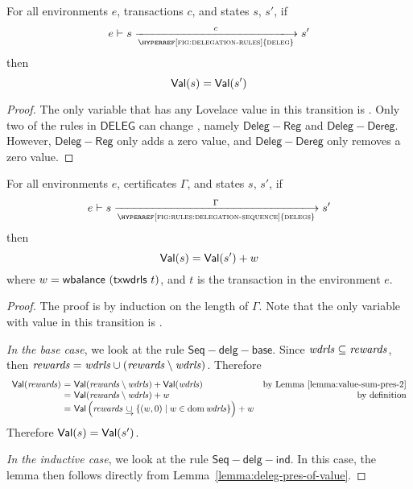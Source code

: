 \begin{lemma}
  \label{lemma:deleg-pres-of-value}
  For all environments $e$, transactions $c$, and states $s$, $s'$, if
  \begin{equation*}
    e\vdash s\trans{\hyperref[fig:delegation-rules]{deleg}}{c}s'
  \end{equation*}
  then
  \begin{equation*}
    \mathsf{Val}(s) = \mathsf{Val}(s')
  \end{equation*}
\end{lemma}

\begin{proof}
  The only variable that has any Lovelace value in this transition is .
  Only two of the rules in $\mathsf{DELEG}$ can change ,
  namely $\mathsf{Deleg{-}Reg}$ and $\mathsf{Deleg{-}Dereg}$.
  However, $\mathsf{Deleg{-}Reg}$ only adds a zero value,
  and $\mathsf{Deleg{-}Dereg}$ only removes a zero value.
\end{proof}

\begin{lemma}
  \label{lemma:delegs-pres-of-value}
  For all environments $e$, certificates $\Gamma$, and states $s$, $s'$, if
  \begin{equation*}
    e\vdash s\trans{\hyperref[fig:rules:delegation-sequence]{delegs}}{\Gamma}s'
  \end{equation*}
  then
  \begin{equation*}
    \mathsf{Val}(s) = \mathsf{Val}(s') + w
  \end{equation*}
  where $w = \mathsf{wbalance}~(\mathsf{txwdrls}~{t})$,
  and $t$ is the transaction in the environment $e$.
\end{lemma}

\begin{proof}
  The proof is by induction on the length of $\Gamma$.
  Note that the only variable with value in this transition is .

  \vspace{2ex}
  \noindent
  \emph{In the base case}, we look at the rule $\mathsf{Seq{-}delg{-}base}$.
  Since $\mathit{wdrls}\subseteq\mathit{rewards}$, then
  $\mathit{rewards} = \mathit{wdrls}\cup\mathit{(\mathit{rewards}\setminus\mathit{wdrls})}$.
%
  Therefore
  \begin{equation*}
    \begin{array}{r@{~=~}lr}
      \Val{(\var{rewards})}
      & \Val{(\var{rewards}\setminus\var{wdrls})} + \Val{(\var{wdrls})}
      & \text{by Lemma~\ref{lemma:value-sum-pres-2}}
      \\
      & \Val{(\var{rewards}\setminus\var{wdrls})} + w
      & \text{by definition}
      \\
      & \Val\left(\var{rewards}\unionoverrideRight\{(w, 0) \mid w \in \dom \var{wdrls}\}\right) + w
    \end{array}
  \end{equation*}
  Therefore $\mathsf{Val}(s) = \mathsf{Val}(s')$.

  \vspace{2ex}
  \noindent
  \emph{In the inductive case}, we look at the rule $\mathsf{Seq{-}delg{-}ind}$.
  In this case, the lemma then follows directly from Lemma~\ref{lemma:deleg-pres-of-value}.
\end{proof}

